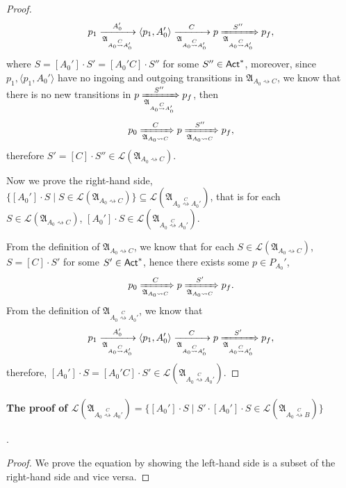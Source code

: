\documentclass[preprint,12pt]{elsarticle}
\newcommand\act{{\sf Act}}
\newcommand\Aut{{\mathfrak{A} }}
\newcommand\Lang{{\mathscr{L} }}
\begin{document}
{\begin{proof}
    $$p_1\xrightarrow[\Aut_{A_0\stackrel{C}\rightsquigarrow A_0'}]{A_0'}\langle p_1,A_0'\rangle\xrightarrow[\Aut_{A_0\stackrel{C}\rightsquigarrow A_0'}]{C}p\xRightarrow[\Aut_{A_0\stackrel{C}\rightsquigarrow A_0'}]{S''}p_f,$$
    where $S = [A_0']\cdot S' = [A_0'C]\cdot S''$ for some $S''\in\act^*$, moreover, since $p_1, \langle p_1,A_0'\rangle$ have no ingoing and outgoing transitions in $\Aut_{A_0\rightsquigarrow C}$, we know that there is no new transitions in $p\xRightarrow[\Aut_{A_0\stackrel{C}\rightsquigarrow A_0'}]{S''}p_f$, then
    $$p_0\xRightarrow[\Aut_{A_0\rightsquigarrow C}]{C}p\xRightarrow[\Aut_{A_0\rightsquigarrow C}]{S''}p_f,$$
    therefore $S' = [C]\cdot S''\in\Lang(\Aut_{A_0\rightsquigarrow C})$.

    Now we prove the right-hand side, $\{[A_0']\cdot S \mid S\in\Lang(\Aut_{A_0\rightsquigarrow C})\}\subseteq \Lang(\Aut_{A_0\stackrel{C}\rightsquigarrow A_0'}) $, that is 
    for each $S\in\Lang(\Aut_{A_0\rightsquigarrow C})$, $[A_0']\cdot S\in\Lang(\Aut_{A_0\stackrel{C}\rightsquigarrow A_0'})$.

    From the definition of $\Aut_{A_0\rightsquigarrow C}$, we know that for each $S\in \Lang(\Aut_{A_0\rightsquigarrow C})$, $S = [C]\cdot S'$ for some $S'\in\act^*$, hence there exists some $p\in P_{A_0}'$, 
    $$p_0\xRightarrow[\Aut_{A_0\rightsquigarrow C}]{C}p\xRightarrow[\Aut_{A_0\rightsquigarrow C}]{S'}p_f.$$
    From the definition of $\Aut_{A_0\stackrel{C}\rightsquigarrow A_0'}$, we know that
    $$p_1\xrightarrow[\Aut_{A_0\stackrel{C}\rightsquigarrow A_0'}]{A_0'}\langle p_1,A_0'\rangle\xrightarrow[\Aut_{A_0\stackrel{C}\rightsquigarrow A_0'}]{C}p\xRightarrow[\Aut_{A_0\stackrel{C}\rightsquigarrow A_0'}]{S'}p_f,$$
    therefore, $[A_0']\cdot S = [A_0'C]\cdot S'\in\Lang(\Aut_{A_0\stackrel{C}\rightsquigarrow A_0'})$.
\end{proof}

\paragraph*{The proof of $\Lang(\Aut_{A_0\stackrel{C}\rightsquigarrow A_0'}) = \{[A_0']\cdot S \mid S'\cdot [A_0']\cdot S\in\Lang(\Aut_{A_0\stackrel{C}\rightsquigarrow B})\}$}.
\begin{proof}
    We prove the equation by showing the left-hand side is a subset of the right-hand side and vice versa.


\end{proof}}
\end{document}
